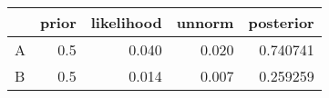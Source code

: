 \begin{tabular}{lrrrr}
\toprule
{} &  prior &  likelihood &  unnorm &  posterior \\
\midrule
A &    0.5 &       0.040 &   0.020 &   0.740741 \\
B &    0.5 &       0.014 &   0.007 &   0.259259 \\
\bottomrule
\end{tabular}
